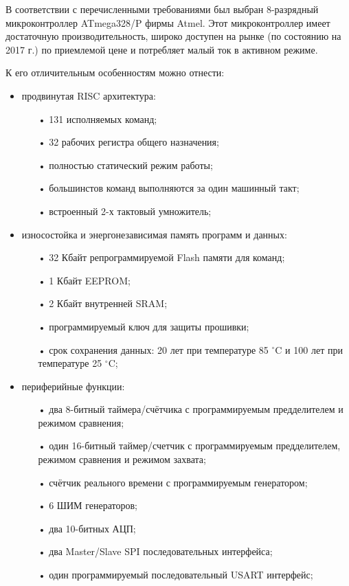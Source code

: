 В соответствии с перечисленными требованиями был выбран 8-разрядный микроконтроллер ATmega328/P фирмы Atmel. Этот микроконтроллер имеет достаточную производительность, широко доступен на рынке (по состоянию на 2017 г.) по приемлемой цене и потребляет малый ток в активном режиме.

К его отличительным особенностям можно отнести\cite{atmegainfo}:
\begin{itemize}
	\item продвинутая RISC архитектура:
	\begin{itemize}
		\item[•] 131 исполняемых команд;
		\item[•] 32 рабочих регистра общего назначения;
		\item[•] полностью статический режим работы;
		\item[•] большинстов команд выполняются за один машинный такт;
		\item[•] встроенный 2-х тактовый умножитель;
	\end{itemize}
	\item износостойка и энергонезависимая память программ и данных:
	\begin{itemize}
		\item[•] 32 Кбайт репрограммируемой Flash памяти для команд;
		\item[•] 1 Кбайт EEPROM;
		\item[•] 2 Кбайт внутренней SRAM;
		\item[•] программируемый ключ для защиты прошивки;
		\item[•] срок сохранения данных: 20 лет при температуре 85 $^{\circ}$C и 100 лет при температуре 25 $^{\circ}$C;
	\end{itemize}
	\item периферийные функции:
	\begin{itemize}
		\item[•] два 8-битный таймера/счётчика с программируемым предделителем и режимом сравнения;
		\item[•] один 16-битный таймер/счетчик с программируемым предделителем, режимом сравнения и режимом захвата;
		\item[•] счётчик реального времени с программируемым генератором;
		\item[•] 6 ШИМ генераторов;
		\item[•] два 10-битных АЦП;
		\item[•] два Master/Slave SPI последовательных интерфейса;
		\item[•] один программируемый последовательный USART интерфейс;

\end{itemize}
\end{itemize}
